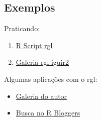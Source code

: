 
\subsection{Exemplos}

\begin{frame}

  Praticando:
  \begin{enumerate}
  \item \href{run:./R/rgl/rgl.R}{R Script rgl}
  \item \href{run:./rgl/RGL.html}{Galeria rgl iguir2}
  \end{enumerate}

  \vspace{0.5cm} Algumas aplicações com o rgl:
  \begin{itemize}
  \item
    \href{http://cran.r-project.org/web/packages/rgl/vignettes/}{Galeria
      do autor}
  \item \href{http://www.r-bloggers.com/?s=rgl}{Busca no R Bloggers}
  \end{itemize}

\end{frame}
